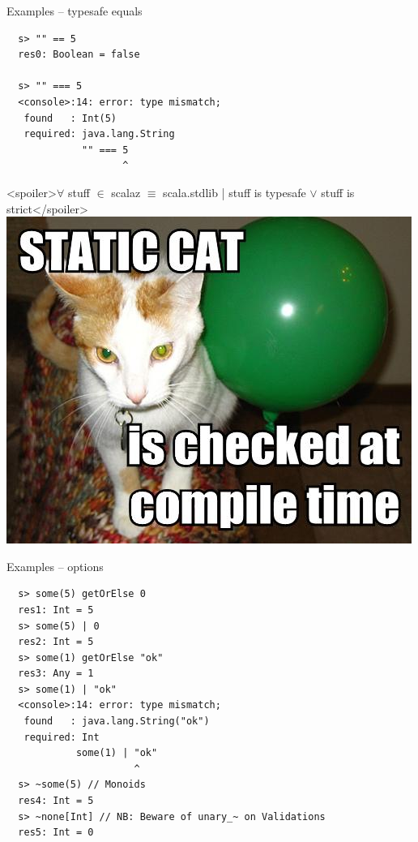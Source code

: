 \documentclass{beamer}
\begin{document}
\begin{frame}[fragile]{Examples -- typesafe equals}
  \begin{verbatim}
  s> "" == 5
  res0: Boolean = false

  s> "" === 5
  <console>:14: error: type mismatch;
   found   : Int(5)
   required: java.lang.String
             "" === 5
                    ^
  \end{verbatim}
  <spoiler>$\forall$ stuff $\in$ scalaz $\equiv$ scala.stdlib | stuff is typesafe $\vee$ stuff is strict</spoiler>\newline
  \includegraphics[scale=0.15]{static_cat}
\end{frame}

\begin{frame}[fragile]{Examples -- options}
  \begin{verbatim}
  s> some(5) getOrElse 0
  res1: Int = 5
  s> some(5) | 0
  res2: Int = 5
  s> some(1) getOrElse "ok"
  res3: Any = 1
  s> some(1) | "ok"
  <console>:14: error: type mismatch;
   found   : java.lang.String("ok")
   required: Int
            some(1) | "ok"
                      ^
  s> ~some(5) // Monoids
  res4: Int = 5
  s> ~none[Int] // NB: Beware of unary_~ on Validations
  res5: Int = 0
  \end{verbatim}
\end{frame}
\end{document}
